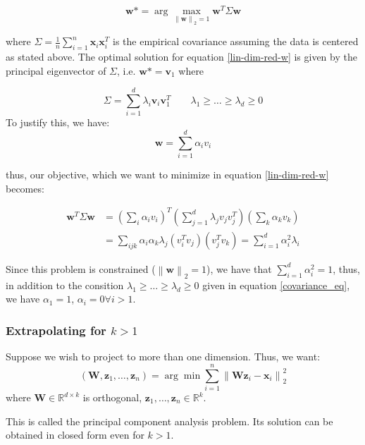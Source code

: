 \documentclass[a4paper,10pt,twoside]{article}
\newcommand\norm[1]{\left\lVert#1\right\rVert}
\begin{document}
\begin{equation}\label{lin-dim-red-w}
    \mathbf{w}*=\arg\max_{\norm{\mathbf{w}}_2=1}\mathbf{w}^T\Sigma\mathbf{w}
\end{equation}

where $\Sigma=\frac{1}{n}\sum_{i=1}^{n}\mathbf{x}_i\mathbf{x}_i^T$ is the empirical covariance assuming the data is centered as stated above. The optimal solution for equation \ref{lin-dim-red-w} is given by the principal eigenvector of $\Sigma$, i.e. $\mathbf{w}*=\mathbf{v}_1$ where

\begin{equation}\label{covariance_eq}
    \Sigma = \sum_{i=1}^{d}\lambda_i\mathbf{v}_i\mathbf{v}_1^T\qquad\lambda_1\geq\ldots\geq\lambda_d\geq 0
\end{equation}
To justify this, we have:
\begin{equation*}
    \mathbf{w}=\sum_{i=1}^{d}\alpha_i v_i
\end{equation*}

thus, our objective, which we want to minimize in equation \ref{lin-dim-red-w} becomes:

\begin{align*}
    \mathbf{w}^T\Sigma\mathbf{w} &= (\sum_{i}\alpha_i v_i)^T(\sum_{j=1}^{d}\lambda_j v_j v_j^T)(\sum_{k}\alpha_k v_k)\\
    &= \sum_{ijk}\alpha_i\alpha_k\lambda_j(v_i^Tv_j)(v_j^Tv_k)=\sum_{i=1}^{d}\alpha_i^2\lambda_i
\end{align*}

Since this problem is constrained ($\norm{\mathbf{w}}_2=1$), we have that $\sum_{i=1}^{d}\alpha_i^2=1$, thus, in addition to the consition $\lambda_1\geq\ldots\geq\lambda_d\geq 0$ given in equation \ref{covariance_eq}, we have $\alpha_1=1$, $\alpha_i=0\forall i>1$.

\subsubsection{Extrapolating for $k>1$}

Suppose we wish to project to more than one dimension. Thus, we want:
\begin{equation*}
    (\mathbf{W}, \mathbf{z}_1, \ldots, \mathbf{z}_n)=\arg\min\sum_{i=1}^{n}\norm{\mathbf{W}\mathbf{z}_i-\mathbf{x}_i}_2^2
\end{equation*}
where $\mathbf{W}\in\mathbb{R}^{d\times k}$ is orthogonal, $\mathbf{z}_1, \ldots, \mathbf{z}_n\in\mathbb{R}^k$.

This is called the principal component analysis problem. Its solution can be obtained in closed form even for $k>1$.
\end{document}
